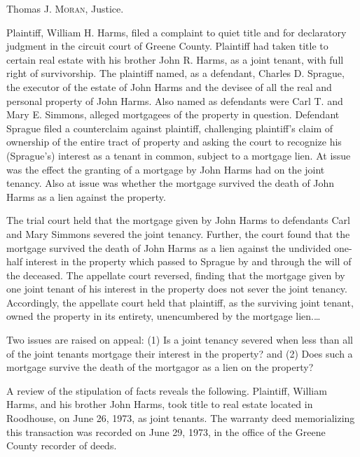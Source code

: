 

\opinion Thomas J. \textsc{Moran}, Justice.

Plaintiff, William H. Harms, filed a complaint to quiet title and for
declaratory judgment in the circuit court of Greene County. Plaintiff had taken
title to certain real estate with his brother John R. Harms, as a joint tenant,
with full right of survivorship. The plaintiff named, as a defendant, Charles
D. Sprague, the executor of the estate of John Harms and the devisee of all the
real and personal property of John Harms. Also named as defendants were Carl T.
and Mary E. Simmons, alleged mortgagees of the property in question. Defendant
Sprague filed a counterclaim against plaintiff, challenging plaintiff's claim
of ownership of the entire tract of property and asking the court to recognize
his (Sprague's) interest as a tenant in common, subject to a mortgage lien. At
issue was the effect the granting of a mortgage by John Harms had on the joint
tenancy. Also at issue was whether the mortgage survived the death of John
Harms as a lien against the property.

The trial court held that the mortgage given by John Harms to defendants Carl
and Mary Simmons severed the joint tenancy. Further, the court found that the
mortgage survived the death of John Harms as a lien against the undivided
one-half interest in the property which passed to Sprague by and through the
will of the deceased. The appellate court reversed, finding that the mortgage
given by one joint tenant of his interest in the property does not sever the
joint tenancy. Accordingly, the appellate court held that plaintiff, as the
surviving joint tenant, owned the property in its entirety, unencumbered by the
mortgage lien.\dots

Two issues are raised on appeal: (1) Is a joint tenancy severed when less than
all of the joint tenants mortgage their interest in the property? and (2) Does
such a mortgage survive the death of the mortgagor as a lien on the property?

 A review of the stipulation of facts reveals the following. Plaintiff, William
Harms, and his brother John Harms, took title to real estate located in
Roodhouse, on June 26, 1973, as joint tenants. The warranty deed memorializing
this transaction was recorded on June 29, 1973, in the office of the Greene
County recorder of deeds.

